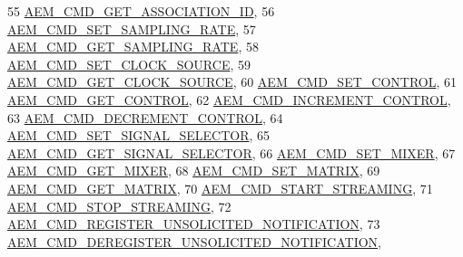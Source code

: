 \begin{DoxyCode}
55     \hyperlink{namespaceavdecc__lib_a1631d53b37995d16b597a5e1a78c55a5a3eac8187755841aff0bcb6214cff2fe5}{AEM\_CMD\_GET\_ASSOCIATION\_ID},
56     \hyperlink{namespaceavdecc__lib_a1631d53b37995d16b597a5e1a78c55a5a3d915e95cc6ee238f4f8c25b3068890d}{AEM\_CMD\_SET\_SAMPLING\_RATE},
57     \hyperlink{namespaceavdecc__lib_a1631d53b37995d16b597a5e1a78c55a5a1126d70f8094c314f447e253a4ea2027}{AEM\_CMD\_GET\_SAMPLING\_RATE},
58     \hyperlink{namespaceavdecc__lib_a1631d53b37995d16b597a5e1a78c55a5a4f67eb4074282d57c34b4c4be9649832}{AEM\_CMD\_SET\_CLOCK\_SOURCE},
59     \hyperlink{namespaceavdecc__lib_a1631d53b37995d16b597a5e1a78c55a5aee0ec9fc2aed03bd58f7166fa5bcba30}{AEM\_CMD\_GET\_CLOCK\_SOURCE},
60     \hyperlink{namespaceavdecc__lib_a1631d53b37995d16b597a5e1a78c55a5a0cdd26c4b92083dd1d45d0895ff4aafe}{AEM\_CMD\_SET\_CONTROL},
61     \hyperlink{namespaceavdecc__lib_a1631d53b37995d16b597a5e1a78c55a5ab3d250d709c2b10edb3eb93778617327}{AEM\_CMD\_GET\_CONTROL},
62     \hyperlink{namespaceavdecc__lib_a1631d53b37995d16b597a5e1a78c55a5a4866fa45934a4287955ed910959b07b0}{AEM\_CMD\_INCREMENT\_CONTROL},
63     \hyperlink{namespaceavdecc__lib_a1631d53b37995d16b597a5e1a78c55a5aefd8f4dcef4aa59025876e4888acc00f}{AEM\_CMD\_DECREMENT\_CONTROL},
64     \hyperlink{namespaceavdecc__lib_a1631d53b37995d16b597a5e1a78c55a5a82d05528893e2dad38ec2d8e24718ebc}{AEM\_CMD\_SET\_SIGNAL\_SELECTOR},
65     \hyperlink{namespaceavdecc__lib_a1631d53b37995d16b597a5e1a78c55a5aef488068771e1010503d826abac96b5f}{AEM\_CMD\_GET\_SIGNAL\_SELECTOR},
66     \hyperlink{namespaceavdecc__lib_a1631d53b37995d16b597a5e1a78c55a5a6587607d74b5cd56bc36d2af8ff63351}{AEM\_CMD\_SET\_MIXER},
67     \hyperlink{namespaceavdecc__lib_a1631d53b37995d16b597a5e1a78c55a5a2552a2bca83390046bea2a06dfb2e14f}{AEM\_CMD\_GET\_MIXER},
68     \hyperlink{namespaceavdecc__lib_a1631d53b37995d16b597a5e1a78c55a5a42c8eb9fda0603d8180695d7daaa127d}{AEM\_CMD\_SET\_MATRIX},
69     \hyperlink{namespaceavdecc__lib_a1631d53b37995d16b597a5e1a78c55a5a768ae3460b1552f423c3f4c662d3717e}{AEM\_CMD\_GET\_MATRIX},
70     \hyperlink{namespaceavdecc__lib_a1631d53b37995d16b597a5e1a78c55a5a7940939bb694db108ba17b7b0e4d6311}{AEM\_CMD\_START\_STREAMING},
71     \hyperlink{namespaceavdecc__lib_a1631d53b37995d16b597a5e1a78c55a5ae6b7f567f8edef7636a6c560f9ed6a6b}{AEM\_CMD\_STOP\_STREAMING},
72     \hyperlink{namespaceavdecc__lib_a1631d53b37995d16b597a5e1a78c55a5ace3744f45a01b201acddfa7a235ee7a6}{AEM\_CMD\_REGISTER\_UNSOLICITED\_NOTIFICATION},
73     \hyperlink{namespaceavdecc__lib_a1631d53b37995d16b597a5e1a78c55a5a5194a0a62ed2fe8561944265ff32d936}{AEM\_CMD\_DEREGISTER\_UNSOLICITED\_NOTIFICATION},

\end{DoxyCode}
